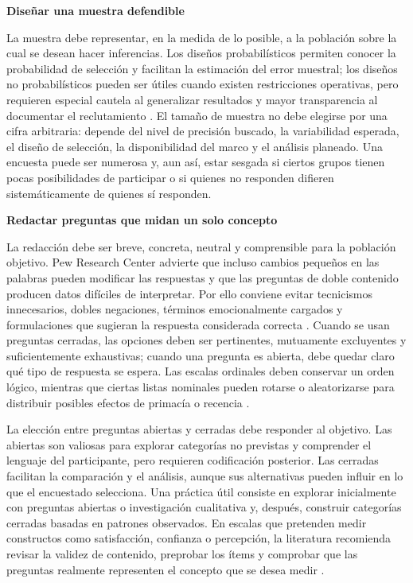 \documentclass[12pt,letterpaper]{article}
\begin{document}
\textbf{Diseñar una muestra defendible}\par
La muestra debe representar, en la medida de lo posible, a la población sobre la cual se desean hacer inferencias. Los diseños probabilísticos permiten conocer la probabilidad de selección y facilitan la estimación del error muestral; los diseños no probabilísticos pueden ser útiles cuando existen restricciones operativas, pero requieren especial cautela al generalizar resultados y mayor transparencia al documentar el reclutamiento \parencite{aapor_best}. El tamaño de muestra no debe elegirse por una cifra arbitraria: depende del nivel de precisión buscado, la variabilidad esperada, el diseño de selección, la disponibilidad del marco y el análisis planeado. Una encuesta puede ser numerosa y, aun así, estar sesgada si ciertos grupos tienen pocas posibilidades de participar o si quienes no responden difieren sistemáticamente de quienes sí responden.

\textbf{Redactar preguntas que midan un solo concepto}\par
La redacción debe ser breve, concreta, neutral y comprensible para la población objetivo. Pew Research Center advierte que incluso cambios pequeños en las palabras pueden modificar las respuestas y que las preguntas de doble contenido producen datos difíciles de interpretar. Por ello conviene evitar tecnicismos innecesarios, dobles negaciones, términos emocionalmente cargados y formulaciones que sugieran la respuesta considerada correcta \parencite{pew_questions}. Cuando se usan preguntas cerradas, las opciones deben ser pertinentes, mutuamente excluyentes y suficientemente exhaustivas; cuando una pregunta es abierta, debe quedar claro qué tipo de respuesta se espera. Las escalas ordinales deben conservar un orden lógico, mientras que ciertas listas nominales pueden rotarse o aleatorizarse para distribuir posibles efectos de primacía o recencia \parencite{pew_questions}.

La elección entre preguntas abiertas y cerradas debe responder al objetivo. Las abiertas son valiosas para explorar categorías no previstas y comprender el lenguaje del participante, pero requieren codificación posterior. Las cerradas facilitan la comparación y el análisis, aunque sus alternativas pueden influir en lo que el encuestado selecciona. Una práctica útil consiste en explorar inicialmente con preguntas abiertas o investigación cualitativa y, después, construir categorías cerradas basadas en patrones observados. En escalas que pretenden medir constructos como satisfacción, confianza o percepción, la literatura recomienda revisar la validez de contenido, preprobar los ítems y comprobar que las preguntas realmente representen el concepto que se desea medir \parencite{artino2014}.
\end{document}
